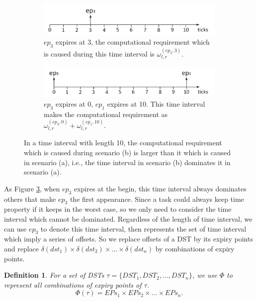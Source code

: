 \documentclass[10pt,conference]{IEEEtran}
\newtheorem{definition}{Definition}
\begin{document}
\begin{figure}  
  \centering
  \begin{subfigure}[t]{3.33in}
    \centering
    \includegraphics[scale=.34]{graphics/figure_combina2-eps-converted-to.pdf}
    \caption{$ep_3$ expires at 3, the computational requirement which is caused during this time interval is $\omega_{l,r}^{(ep_3,3)}.$}\label{figure_combination1}
  \end{subfigure}
  \quad
  \begin{subfigure}[t]{3.33in}
    \centering
    \includegraphics[scale=.34]{graphics/figure_combina1-eps-converted-to.pdf}
    \caption{$ep_3$ expires at 0, $ep_1$ expires at 10. This time interval makes the computational requirement as $\omega_{l,r}^{(ep_3,0)}+\omega_{l,r}^{(ep_1,10)}$.}\label{figure_combination2}
  \end{subfigure}
  \caption{In a time interval with length 10, the computational requirement which is caused during scenario (b) is larger than it which is caused in scenario (a), i.e., the time interval in scenario (b) dominates it in scenario (a).}\label{figure_combination}
\end{figure}
As Figure \ref{figure_combination}, when $ep_3$ expires at the begin, this time interval always dominates others that make $ep_3$ the first appearance. Since a task could always keep time property if it keeps in the worst case, so we only need to consider the time interval which cannot be dominated. Regardless of the length of time interval, we can use $ep_3$ to denote this time interval, then represents the set of time interval which imply a series of offsets. So we replace offsets of a DST by its expiry points and replace $\delta(dst_1)\times\delta(dst_2)\times\dots\times\delta(dst_n)$ by combinations of expiry points.
\begin{definition}
For a set of DSTs $\tau=\{DST_1,DST_2,\dots,DST_n\}$, we use $\Phi$ to represent all combinations of expiry points of $\tau$.
\begin{equation}
  \Phi(\tau)=EPs_1 \times EPs_2\times\dots\times EPs_n.
\end{equation}\label{equation_combination}
\end{definition}
\end{document}
